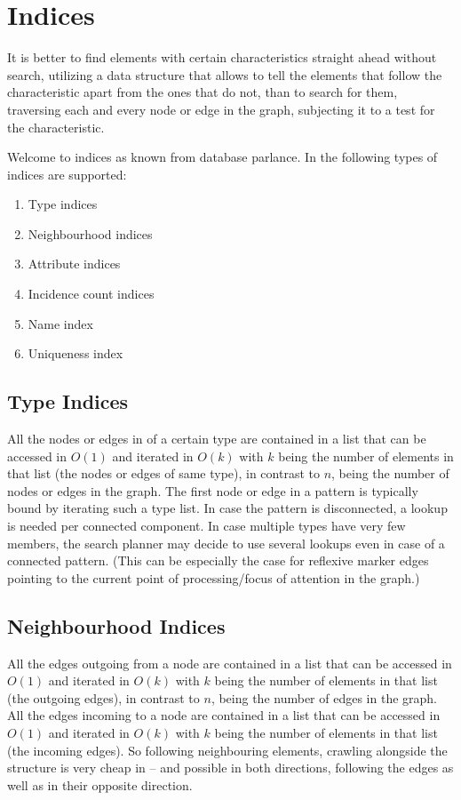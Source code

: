 \chapter{Indices}\label{cha:indices} 

It is better to find elements with certain characteristics straight ahead without search,
utilizing a data structure that allows to tell the elements that follow the characteristic apart from the ones that do not,
than to search for them, traversing each and every node or edge in the graph, subjecting it to a test for the characteristic.

Welcome to indices as known from database parlance.
In \GrG{} the following types of indices are supported:
\begin{enumerate}
	\item Type indices
	\item Neighbourhood indices
	\item Attribute indices
	\item Incidence count indices
	\item Name index
	\item Uniqueness index
\end{enumerate}

\section{Type Indices}\label{sec:typeindices}
All the nodes or edges in \GrG{} of a certain type are contained in a list that can be accessed in $O(1)$ and iterated in $O(k)$ with $k$ being the number of elements in that list (the nodes or edges of same type), in contrast to $n$, being the number of nodes or edges in the graph.
The first node or edge in a pattern is typically bound by iterating such a type list.
In case the pattern is disconnected, a lookup is needed per connected component.
In case multiple types have very few members, the search planner may decide to use several lookups even in case of a connected pattern.
(This can be especially the case for reflexive marker edges pointing to the current point of processing/focus of attention in the graph.)

\section{Neighbourhood Indices}\label{sec:neighbourhoodindices}
All the edges outgoing from a node are contained in a list that can be accessed in $O(1)$ and iterated in $O(k)$ with $k$ being the number of elements in that list (the outgoing edges), in contrast to $n$, being the number of edges in the graph.
All the edges incoming to a node are contained in a list that can be accessed in $O(1)$ and iterated in $O(k)$ with $k$ being the number of elements in that list (the incoming edges).
So following neighbouring elements, crawling alongside the structure is very cheap in \GrG{ } -- and possible in both directions, following the edges as well as in their opposite direction.

